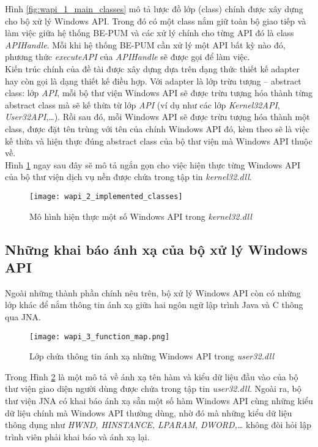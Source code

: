 Hình \ref{fig:wapi_1_main_classes} mô tả lược đồ lớp (class) chính được xây dựng cho bộ xử lý Windows API. Trong đó có một class nắm giữ toàn bộ giao tiếp và làm việc giữa hệ thống BE-PUM và các xử lý chính cho từng API đó là class \textit{APIHandle}. Mỗi khi hệ thống BE-PUM cần xử lý một API bất kỳ nào đó, phương thức \textit{executeAPI} của \textit{APIHandle} sẽ được gọi để làm việc.\\

Kiến trúc chính của đề tài được xây dựng dựa trên dạng thức thiết kế adapter hay còn gọi là dạng thiết kế điều hợp. Với adapter là lớp trừu tượng – abstract class: lớp \textit{API}, mỗi bộ thư viện Windows API sẽ được trừu tượng hóa thành từng abstract class mà sẽ kế thừa từ lớp \textit{API} (ví dụ như các lớp \textit{Kernel32API}, \textit{User32API},…). Rồi sau đó, mỗi Windows API sẽ được trừu tượng hóa thành một class, được đặt tên trùng với tên của chính Windows API đó, kèm theo sẽ là việc kế thừa và hiện thực đúng abstract class của bộ thư viện mà Windows API thuộc về.\\

Hình \ref{fig:wapi_2_implemented_classes} ngay sau đây sẽ mô tả ngắn gọn cho việc hiện thực từng Windows API của bộ thư viện dịch vụ nền được chứa trong tập tin \textit{kernel32.dll}.

	\begin{figure}[htp]
	\centering
		\texttt{[image: wapi\_2\_implemented\_classes]}
		\caption{Mô hình hiện thực một số Windows API trong \textit{kernel32.dll}}	
		\label{fig:wapi_2_implemented_classes}		
	\end{figure}

	\newpage
	\subsection{Những khai báo ánh xạ của bộ xử lý Windows API} \label{sec:mapping}

Ngoài những thành phần chính nêu trên, bộ xử lý Windows API còn có những lớp khác để nắm thông tin ánh xạ giữa hai ngôn ngữ lập trình Java và C thông qua JNA.

	\begin{figure}[H]
	\centering
		\texttt{[image: wapi\_3\_function\_map.png]}
		\caption{Lớp chứa thông tin ánh xạ những Windows API trong \textit{user32.dll}}	
		\label{fig:wapi_3_function_map}		
	\end{figure}

Trong Hình \ref{fig:wapi_3_function_map} là một mô tả về ánh xạ tên hàm và kiểu dữ liệu đầu vào của bộ thư viện giao diện người dùng được chứa trong tập tin \textit{user32.dll}. Ngoài ra, bộ thư viện JNA có khai báo ánh xạ sẵn một số hàm Windows API cùng những kiểu dữ liệu chính mà Windows API thường dùng, nhờ đó mà những kiểu dữ liệu thông dụng như \textit{HWND, HINSTANCE, LPARAM, DWORD,…} không đòi hỏi lập trình viên phải khai báo và ánh xạ lại.\\

